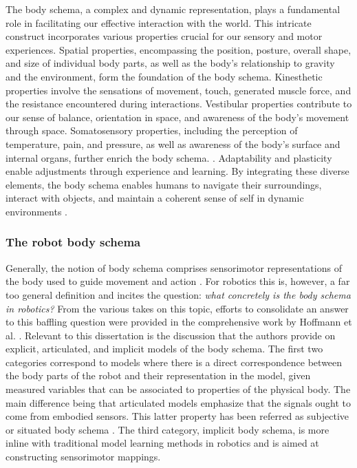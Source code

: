 The body schema, a complex and dynamic representation, plays a fundamental role in facilitating our effective interaction with the world. This intricate construct incorporates various properties crucial for our sensory and motor experiences. Spatial properties, encompassing the position, posture, overall shape, and size of individual body parts, as well as the body's relationship to gravity and the environment, form the foundation of the body schema. Kinesthetic properties involve the sensations of movement, touch, generated muscle force, and the resistance encountered during interactions. Vestibular properties contribute to our sense of balance, orientation in space, and awareness of the body's movement through space. Somatosensory properties, including the perception of temperature, pain, and pressure, as well as awareness of the body's surface and internal organs, further enrich the body schema. . Adaptability and plasticity enable adjustments through experience and learning. By integrating these diverse elements, the body schema enables humans to navigate their surroundings, interact with objects, and maintain a coherent sense of self in dynamic environments \cite{Vignemont20213C1Whatisbody,Morasso2015Revisitingbodyschema,Asada2018168Proprioceptionbodyschema}.


\subsubsection{The robot body schema}
Generally, the notion of body schema comprises sensorimotor representations of the body used to guide movement and action \cite{Asada2018168Proprioceptionbodyschema}. For robotics this is, however, a far too general definition and incites the question: \textit{what concretely is the body schema in robotics?} From the various takes on this topic, efforts to consolidate an answer to this baffling question were provided in the comprehensive work by Hoffmann et al. \cite{Hoffmann2010Bodyschemarobotics}. Relevant to this dissertation is the discussion that the authors provide on explicit, articulated, and implicit models of the body schema. The first two categories correspond to models where there is a direct correspondence between the body parts of
the robot and their representation in the model, given measured variables that can be associated to properties of the physical body. The main difference being that articulated models \cite{Grush2004emulationtheoryrepresentation} emphasize that the signals ought to come from embodied sensors. This latter property has been referred as subjective or situated body schema \cite{Hersch2008Onlinelearningbody}. The third category, implicit body schema, is more inline with traditional model learning methods in robotics and is aimed at constructing sensorimotor mappings.

